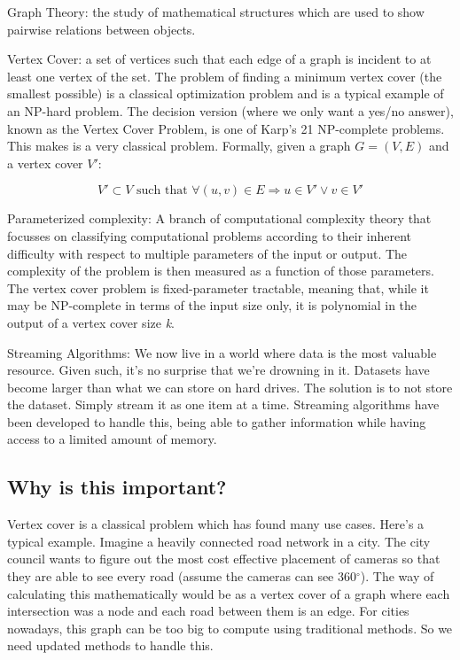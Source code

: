 Graph Theory: the study of mathematical structures which are used to show pairwise relations between objects.

Vertex Cover: a set of vertices such that each edge of a graph is incident to at least one vertex of the set. The problem of finding a minimum vertex cover (the smallest possible) is a classical optimization problem and is a typical example of an NP-hard problem. The decision version (where we only want a yes/no answer), known as the Vertex Cover Problem, is one of Karp's 21 NP-complete problems. This makes is a very classical problem. Formally, given a graph \(G = (V, E)\) and a vertex cover \(V'\):

\[V' \subset V \text{ such that } \forall (u, v) \in E \Rightarrow u \in V' \vee v \in V' \]

Parameterized complexity: A branch of computational complexity theory that focusses on classifying computational problems according to their inherent difficulty with respect to multiple parameters of the input or output. The complexity of the problem is then measured as a function of those parameters. The vertex cover problem is fixed-parameter tractable, meaning that, while it may be NP-complete in terms of the input size only, it is polynomial in the output of a vertex cover size \emph{k}.

Streaming Algorithms: We now live in a world where data is the most valuable resource. Given such, it's no surprise that we're drowning in it. Datasets have become larger than what we can store on hard drives. The solution is to not store the dataset. Simply stream it as one item at a time. Streaming algorithms have been developed to handle this, being able to gather information while having access to a limited amount of memory.

\subsection{Why is this important?}

Vertex cover is a classical problem which has found many use cases. Here's a typical example. Imagine a heavily connected road network in a city. The city council wants to figure out the most cost effective placement of cameras so that they are able to see every road (assume the cameras can see 360$^\circ$). The way of calculating this mathematically would be as a vertex cover of a graph where each intersection was a node and each road between them is an edge. For cities nowadays, this graph can be too big to compute using traditional methods. So we need updated methods to handle this.

